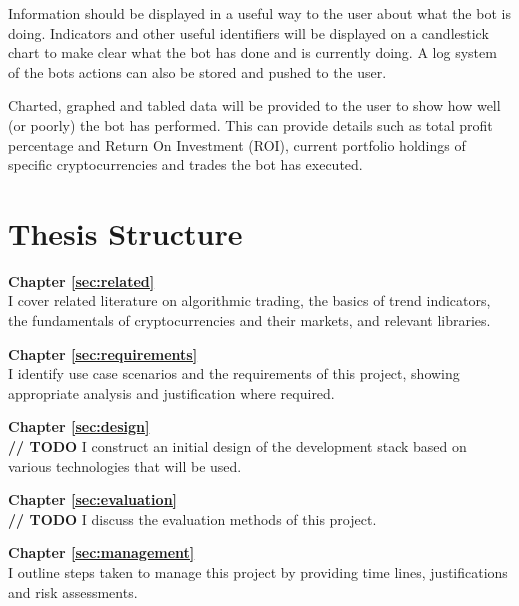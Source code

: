 Information should be displayed in a useful way to the user about what the bot is doing. Indicators and other useful identifiers will be displayed on a candlestick chart to make clear what the bot has done and is currently doing. A log system of the bots actions can also be stored and pushed to the user.

Charted, graphed and tabled data will be provided to the user to show how well (or poorly) the bot has performed. This can provide details such as total profit percentage and Return On Investment (ROI), current portfolio holdings of specific cryptocurrencies and trades the bot has executed.



\section{Thesis Structure}
\label{sec:intro:structure}

\noindent\textbf{Chapter \ref{sec:related}} \\[0.2em]
I cover related literature on algorithmic trading, the basics of trend indicators, the fundamentals of cryptocurrencies and their markets, and relevant libraries.

\noindent\textbf{Chapter \ref{sec:requirements}} \\[0.2em]
I identify use case scenarios and the requirements of this project, showing appropriate analysis and justification where required.

\noindent\textbf{Chapter \ref{sec:design}} \\[0.2em]
\textbf{// TODO}
I construct an initial design of the development stack based on various technologies that will be used.

\noindent\textbf{Chapter \ref{sec:evaluation}} \\[0.2em]
\textbf{// TODO}
I discuss the evaluation methods of this project.

\noindent\textbf{Chapter \ref{sec:management}} \\[0.2em]
I outline steps taken to manage this project by providing time lines, justifications and risk assessments.